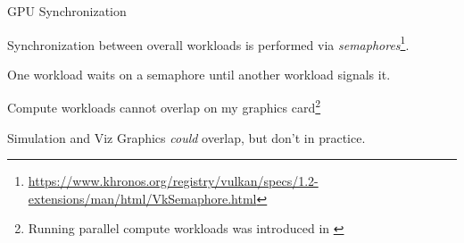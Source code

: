 \begin{frame}{GPU Synchronization}
{\begin{tikzpicture}[
            scale=0.9, every node/.style={scale=0.9},
        fixedrect/.style={rectangle,draw,minimum height=4em,anchor=west,text width=2cm,align=center},
        ]
        \end{tikzpicture}
    }

    \vfill\null
    
    \begin{wideitemize}
        \item Synchronization between overall workloads is performed via \emph{semaphores}\footnote{\url{https://www.khronos.org/registry/vulkan/specs/1.2-extensions/man/html/VkSemaphore.html}}.
        \item One workload waits on a semaphore until another workload signals it.
        \item Compute workloads cannot overlap on my graphics card\footnote{Running parallel compute workloads was introduced in \parencite{nvidiaAmpereWhitepaper}}
        \item Simulation and Viz Graphics \emph{could} overlap, but don't in practice.
    \end{wideitemize}
\end{frame}

